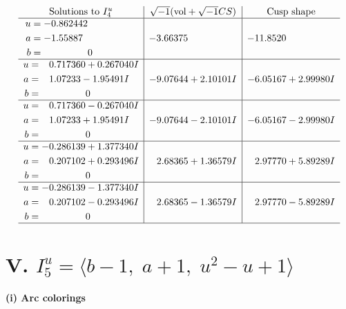 \documentclass[1p]{elsarticle_modified}
\theoremstyle{definition}
\newcommand{\I}{\sqrt{-1}}
\begin{document}
$$\begin{array}{c|c|c}  
\text{Solutions to }I^u_{4}& \I (\text{vol} + \sqrt{-1}CS) & \text{Cusp shape}\\
 \hline 
\begin{aligned}
u &= -0.862442\phantom{ +0.000000I} \\
a &= -1.55887\phantom{ +0.000000I} \\
b &= \phantom{-0.000000 } 0\end{aligned}
 & -3.66375\phantom{ +0.000000I} & -11.8520\phantom{ +0.000000I} \\ \hline\begin{aligned}
u &= \phantom{-}0.717360 + 0.267040 I \\
a &= \phantom{-}1.07233 - 1.95491 I \\
b &= \phantom{-0.000000 } 0\end{aligned}
 & -9.07644 + 2.10101 I & -6.05167 + 2.99980 I \\ \hline\begin{aligned}
u &= \phantom{-}0.717360 - 0.267040 I \\
a &= \phantom{-}1.07233 + 1.95491 I \\
b &= \phantom{-0.000000 } 0\end{aligned}
 & -9.07644 - 2.10101 I & -6.05167 - 2.99980 I \\ \hline\begin{aligned}
u &= -0.286139 + 1.377340 I \\
a &= \phantom{-}0.207102 + 0.293496 I \\
b &= \phantom{-0.000000 } 0\end{aligned}
 & \phantom{-}2.68365 + 1.36579 I & \phantom{-}2.97770 + 5.89289 I \\ \hline\begin{aligned}
u &= -0.286139 - 1.377340 I \\
a &= \phantom{-}0.207102 - 0.293496 I \\
b &= \phantom{-0.000000 } 0\end{aligned}
 & \phantom{-}2.68365 - 1.36579 I & \phantom{-}2.97770 - 5.89289 I\\
 \hline 
 \end{array}$$\newpage\newpage\renewcommand{\arraystretch}{1}
\centering \section*{V. $I^u_{5}= \langle b-1,\;a+1,\;u^2- u+1 \rangle$}
\flushleft \textbf{(i) Arc colorings}\\
\end{document}
